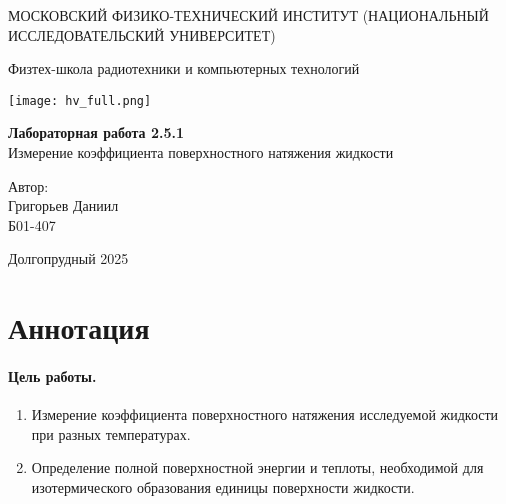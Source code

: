 \documentclass[12pt]{article}
\begin{document}
\begin{titlepage}
\begin{center}
    {\large МОСКОВСКИЙ ФИЗИКО-ТЕХНИЧЕСКИЙ ИНСТИТУТ (НАЦИОНАЛЬНЫЙ ИССЛЕДОВАТЕЛЬСКИЙ УНИВЕРСИТЕТ)}
\end{center}

\begin{center}
    {\large Физтех-школа радиотехники и компьютерных технологий}
\end{center}

\vspace{3.5cm}

\begin{center}
    \texttt{[image: hv\_full.png]}
\end{center}

\vspace{0.05cm}

{\huge
\begin{center}
    {\bf Лабораторная работа 2.5.1}\\
    Измерение коэффициента поверхностного натяжения жидкости
\end{center}
}

\vspace{0.5cm}

\begin{flushright}
{\LARGE Автор:\\ Григорьев Даниил \\
\vspace{0.1cm}
Б01-407}
\end{flushright}

\vspace{0.5cm}
\begin{center}
    Долгопрудный 2025
\end{center}
\end{titlepage}

\section{Аннотация}
    \paragraph{Цель работы.}
    \begin{enumerate}
        \item Измерение коэффициента поверхностного натяжения исследуемой
        жидкости при разных температурах.
        \item Определение полной поверхностной энергии и теплоты, необходимой
        для изотермического образования единицы поверхности жидкости.
    \end{enumerate}
\end{document}
